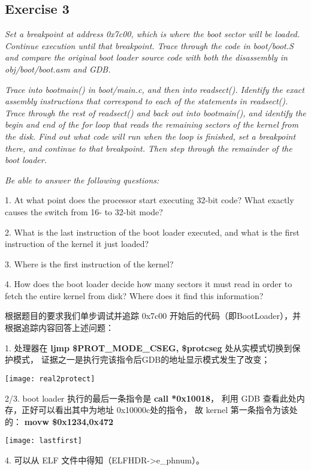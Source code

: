 \documentclass[12pt, letterpaper]{report}
\begin{document}
\subsection{\large Exercise 3}
\textsl{
        Set a breakpoint at address 0x7c00, 
        which is where the boot sector will be loaded. 
        Continue execution until that breakpoint. 
        Trace through the code in boot/boot.S 
        and compare the original boot loader source code with 
        both the disassembly in obj/boot/boot.asm and GDB.
} \par 

\textsl{
        Trace into bootmain() in boot/main.c, and then into readsect(). 
        Identify the exact assembly instructions that correspond to each of the statements in readsect(). 
        Trace through the rest of readsect() and back out into bootmain(), and identify the begin and end of the for loop 
        that reads the remaining sectors of the kernel from the disk. 
        Find out what code will run when the loop is finished, 
        set a breakpoint there, and continue to that breakpoint. 
        Then step through the remainder of the boot loader.
} \par
\quad \par
\textsl{
        Be able to answer the following questions:
} \par
{
        1. At what point does the processor start executing 32-bit code? 
        What exactly causes the switch from 16- to 32-bit mode?
} \par
{
        2. What is the last instruction of the boot loader executed, 
        and what is the first instruction of the kernel it just loaded?
} \par
{
        3. Where is the first instruction of the kernel?
} \par 
{
        4. How does the boot loader decide how many sectors 
        it must read in order to fetch the entire kernel from disk? 
        Where does it find this information?
} \par 
\quad \par
根据题目的要求我们单步调试并追踪 0x7c00 开始后的代码（即BootLoader），并根据追踪内容回答上述问题：\par 
{
        1. 处理器在 \textbf{ljmp    \$PROT\_MODE\_CSEG, \$protcseg} 处从实模式切换到保护模式，
        证据之一是执行完该指令后GDB的地址显示模式发生了改变；
} \par
\quad \par 
\texttt{[image: real2protect]}
\quad \par 
{
        2/3. boot loader 执行的最后一条指令是 \textbf{call *0x10018}，
        利用 GDB 查看此处内存，正好可以看出其中为地址 0x10000c处的指令，
        故 kernel 第一条指令为该处的： \textbf{movw   \$0x1234,0x472}
} \par
\quad \par  
\texttt{[image: lastfirst]}
\quad \par
{
        4. 可以从 ELF 文件中得知（ELFHDR->e\_phnum）。
} \par 
\end{document}
